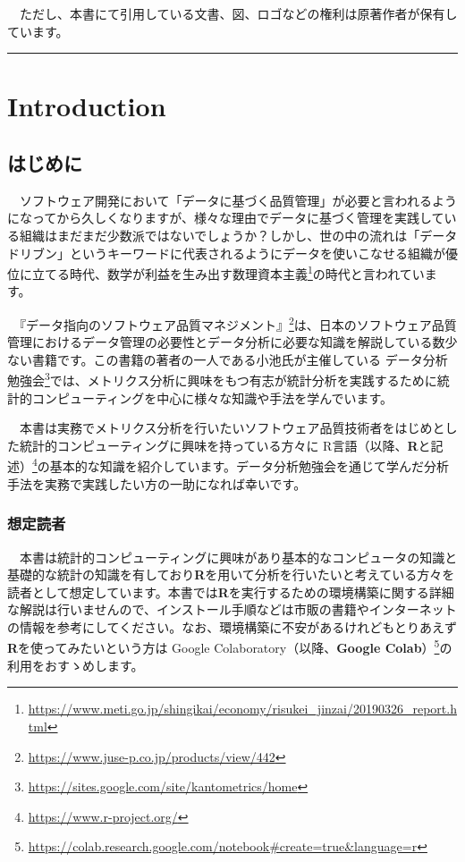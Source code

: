 \documentclass[
  12pt,
]{book}
\DeclareRobustCommand{\href}[2]{#2\footnote{\url{#1}}}
\begin{document}
　ただし、本書にて引用している文書、図、ロゴなどの権利は原著作者が保有しています。

\begin{center}\rule{0.5\linewidth}{0.5pt}\end{center}

\hypertarget{part-introduction}{%
\part{Introduction}\label{part-introduction}}

\hypertarget{ux306fux3058ux3081ux306b}{%
\chapter*{はじめに}\label{ux306fux3058ux3081ux306b}}

　ソフトウェア開発において「データに基づく品質管理」が必要と言われるようになってから久しくなりますが、様々な理由でデータに基づく管理を実践している組織はまだまだ少数派ではないでしょうか？しかし、世の中の流れは「データドリブン」というキーワードに代表されるようにデータを使いこなせる組織が優位に立てる時代、数学が利益を生み出す\href{https://www.meti.go.jp/shingikai/economy/risukei_jinzai/20190326_report.html}{数理資本主義}の時代と言われています。

　\href{https://www.juse-p.co.jp/products/view/442}{『データ指向のソフトウェア品質マネジメント』}は、日本のソフトウェア品質管理におけるデータ管理の必要性とデータ分析に必要な知識を解説している数少ない書籍です。この書籍の著者の一人である小池氏が主催している \href{https://sites.google.com/site/kantometrics/home}{データ分析勉強会}では、メトリクス分析に興味をもつ有志が統計分析を実践するために統計的コンピューティングを中心に様々な知識や手法を学んでいます。

　本書は実務でメトリクス分析を行いたいソフトウェア品質技術者をはじめとした統計的コンピューティングに興味を持っている方々に \href{https://www.r-project.org/}{R言語（以降、\textbf{R}と記述）}の基本的な知識を紹介しています。データ分析勉強会を通じて学んだ分析手法を実務で実践したい方の一助になれば幸いです。

\hypertarget{ux60f3ux5b9aux8aadux8005}{%
\section*{想定読者}\label{ux60f3ux5b9aux8aadux8005}}

　本書は統計的コンピューティングに興味があり基本的なコンピュータの知識と基礎的な統計の知識を有しており\textbf{R}を用いて分析を行いたいと考えている方々を読者として想定しています。本書では\textbf{R}を実行するための環境構築に関する詳細な解説は行いませんので、インストール手順などは市販の書籍やインターネットの情報を参考にしてください。なお、環境構築に不安があるけれどもとりあえず\textbf{R}を使ってみたいという方は \href{https://colab.research.google.com/notebook\#create=true\&language=r}{Google Colaboratory（以降、\textbf{Google Colab}）}の利用をおすゝめします。
\end{document}
